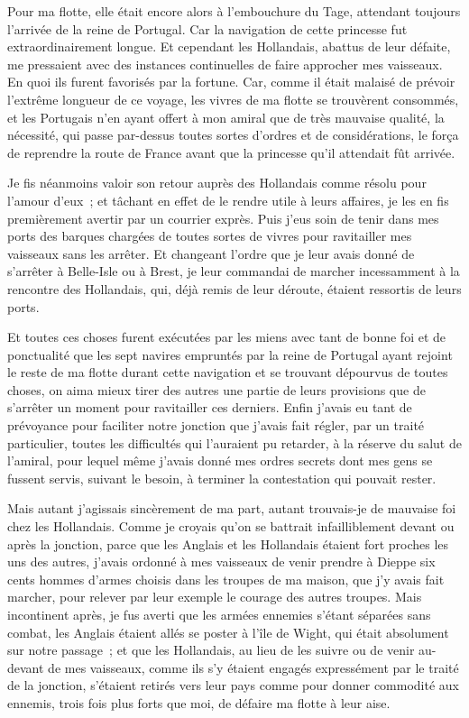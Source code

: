 \documentclass[french,twoside]{book} %
\begin{document}
Pour ma flotte, elle était encore alors à l’embouchure du Tage, attendant toujours l’arrivée de la reine de Portugal. Car la navigation de cette princesse fut extraordinairement longue. Et cependant les Hollandais, abattus de leur défaite, me pressaient avec des instances continuelles de faire approcher mes vaisseaux. En quoi ils furent favorisés par la fortune. Car, comme il était malaisé de prévoir l’extrême longueur de ce voyage, les vivres de ma flotte se trouvèrent consommés, et les Portugais n’en ayant offert à mon amiral que de très mauvaise qualité, la nécessité, qui passe par-dessus toutes sortes d’ordres et de considérations, le força de reprendre la route de France avant que la princesse qu’il attendait fût arrivée.\par
Je fis néanmoins valoir son retour auprès des Hollandais comme résolu pour l’amour d’eux ; et tâchant en effet de le rendre utile à leurs affaires, je les en fis premièrement avertir par un courrier exprès. Puis j’eus soin de tenir dans mes ports des barques chargées de toutes sortes de vivres pour ravitailler mes vaisseaux sans les arrêter. Et changeant l’ordre que je leur avais donné de s’arrêter à Belle-Isle ou à Brest, je leur commandai de marcher incessamment à la rencontre des Hollandais, qui, déjà remis de leur déroute, étaient ressortis de leurs ports.\par
Et toutes ces choses furent exécutées par les miens avec tant de bonne foi et de ponctualité que les sept navires empruntés par la reine de Portugal ayant rejoint le reste de ma flotte durant cette navigation et se trouvant dépourvus de toutes choses, on aima mieux tirer des autres une partie de leurs provisions que de s’arrêter un moment pour ravitailler ces derniers. Enfin j’avais eu tant de prévoyance pour faciliter notre jonction que j’avais fait régler, par un traité particulier, toutes les difficultés qui l’auraient pu retarder, à la réserve du salut de l’amiral, pour lequel même j’avais donné mes ordres secrets dont mes gens se fussent servis, suivant le besoin, à terminer la contestation qui pouvait rester.\par
Mais autant j’agissais sincèrement de ma part, autant trouvais-je de mauvaise foi chez les Hollandais. Comme je croyais qu’on se battrait infailliblement devant ou après la jonction, parce que les Anglais et les Hollandais étaient fort proches les uns des autres, j’avais ordonné à mes vaisseaux de venir prendre à Dieppe six cents hommes d’armes choisis dans les troupes de ma maison, que j’y avais fait marcher, pour relever par leur exemple le courage des autres troupes. Mais incontinent après, je fus averti que les armées ennemies s’étant séparées sans combat, les Anglais étaient allés se poster à l’île de Wight, qui était absolument sur notre passage ; et que les Hollandais, au lieu de les suivre ou de venir au-devant de mes vaisseaux, comme ils s’y étaient engagés expressément par le traité de la jonction, s’étaient retirés vers leur pays comme pour donner commodité aux ennemis, trois fois plus forts que moi, de défaire ma flotte à leur aise.\par
\end{document}
